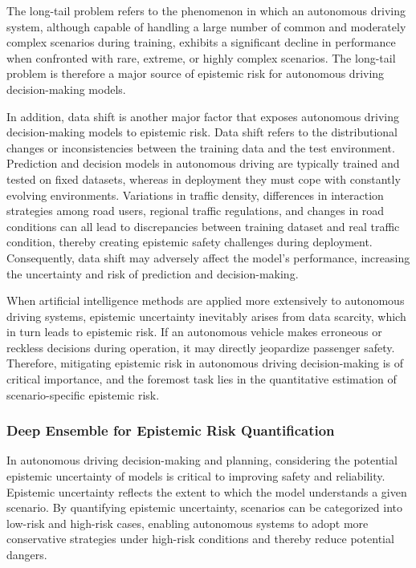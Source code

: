 \documentclass[preprint,12pt,authoryear]{elsarticle}
\begin{document}
The long-tail problem refers to the phenomenon in which an autonomous driving system, although capable of handling a large number of common and moderately complex scenarios during training, exhibits a significant decline in performance when confronted with rare, extreme, or highly complex scenarios. The long-tail problem is therefore a major source of epistemic risk for autonomous driving decision-making models.

In addition, data shift is another major factor that exposes autonomous driving decision-making models to epistemic risk. Data shift refers to the distributional changes or inconsistencies between the training data and the test environment. Prediction and decision models in autonomous driving are typically trained and tested on fixed datasets, whereas in deployment they must cope with constantly evolving environments. Variations in traffic density, differences in interaction strategies among road users, regional traffic regulations, and changes in road conditions can all lead to discrepancies between training dataset and real traffic condition, thereby creating epistemic safety challenges during deployment. Consequently, data shift may adversely affect the model’s performance, increasing the uncertainty and risk of prediction and decision-making.

When artificial intelligence methods are applied more extensively to autonomous driving systems, epistemic uncertainty inevitably arises from data scarcity, which in turn leads to epistemic risk. If an autonomous vehicle makes erroneous or reckless decisions during operation, it may directly jeopardize passenger safety. Therefore, mitigating epistemic risk in autonomous driving decision-making is of critical importance, and the foremost task lies in the quantitative estimation of scenario-specific epistemic risk.


\subsubsection{Deep Ensemble for Epistemic Risk Quantification}

In autonomous driving decision-making and planning, considering the potential epistemic uncertainty of models is critical to improving safety and reliability. Epistemic uncertainty reflects the extent to which the model understands a given scenario. By quantifying epistemic uncertainty, scenarios can be categorized into low-risk and high-risk cases, enabling autonomous systems to adopt more conservative strategies under high-risk conditions and thereby reduce potential dangers.
\end{document}
